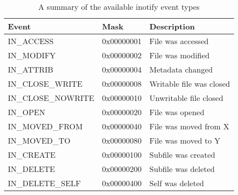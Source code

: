 \begin{table}
    \centering
    \begin{tabular}{ l l l }
        \toprule
        Event               & Mask          & Description
        \\ \midrule
        IN\_ACCESS          & 0x00000001    & File was accessed
        \\
        IN\_MODIFY          & 0x00000002    & File was modified
        \\
        IN\_ATTRIB          & 0x00000004    & Metadata changed
        \\
        IN\_CLOSE\_WRITE    & 0x00000008    & Writable file was closed
        \\
        IN\_CLOSE\_NOWRITE  & 0x00000010    & Unwritable file closed
        \\
        IN\_OPEN            & 0x00000020    & File was opened
        \\
        IN\_MOVED\_FROM     & 0x00000040    & File was moved from X
        \\
        IN\_MOVED\_TO       & 0x00000080    & File was moved to Y
        \\
        IN\_CREATE          & 0x00000100    & Subfile was created
        \\
        IN\_DELETE          & 0x00000200    & Subfile was deleted
        \\
        IN\_DELETE\_SELF    & 0x00000400    & Self was deleted
        \\
        \bottomrule
    \end{tabular}
    \caption{A summary of the available inotify event types \cite{love2005}}
    \label{tab:inotify-events}
\end{table}
